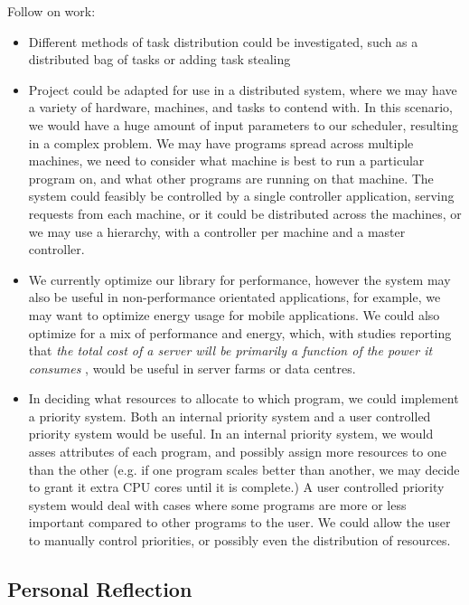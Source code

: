 Follow on work:

\begin{itemize}
	\item Different methods of task distribution could be investigated, such as a distributed bag of tasks or adding task stealing
	\item Project could be adapted for use in a distributed system, where we may have a variety of hardware, machines, and tasks to contend with. In this scenario, we would have a huge amount of input parameters to our scheduler, resulting in a complex problem. We may have programs spread across multiple machines, we need to consider what machine is best to run a particular program on, and what other programs are running on that machine. The system could feasibly be controlled by a single controller application, serving requests from each machine, or it could be distributed across the machines, or we may use a hierarchy, with a controller per machine and a master controller. 
	\item We currently optimize our library for performance, however the system may also be useful in non-performance orientated applications, for example, we may want to optimize energy usage for mobile applications. We could also optimize for a mix of performance and energy, which, with studies reporting that \textit{the total cost of a server will be primarily a function of the power it consumes} \cite{datacentres}, would be useful in server farms or data centres.
	\item In deciding what resources to allocate to which program, we could implement a priority system. Both an internal priority system and a user controlled priority system would be useful. In an internal priority system, we would asses attributes of each program, and possibly assign more resources to one than the other (e.g. if one program scales better than another, we may decide to grant it extra CPU cores until it is complete.) A user controlled priority system would deal with cases where some programs are more or less important compared to other programs to the user. We could allow the user to manually control priorities, or possibly even the distribution of resources. 
\end{itemize}



\subsection{Personal Reflection}


